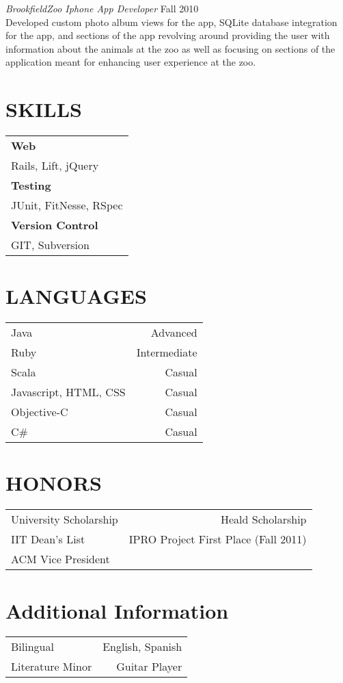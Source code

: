 \documentclass[margin]{res}
\newcommand{\tab}{\hspace*{2em}}
\begin{document}
\begin{resume}
               							 {\sl BrookfieldZoo Iphone App Developer} \hfill            Fall 2010 \\
														\tab Developed custom photo album views for the app, SQLite database integration for the app, and sections of the app revolving around providing the user with information about the animals at the zoo as well as focusing on sections of the application meant for enhancing user experience at the zoo.
  
\section{SKILLS} 
		\begin{tabular}{ l }
		\bf Web \\
		\tab Rails, Lift, jQuery\\
		\bf Testing\\
		\tab JUnit, FitNesse, RSpec\\
		\bf Version Control\\
		\tab GIT, Subversion\\
		\end{tabular}

\section{LANGUAGES}
		\begin{tabular}{ l r }
  			Java & Advanced \\
 			Ruby & Intermediate \\
                   	Scala & Casual \\
                   	Javascript, HTML, CSS & Casual \\
                   	Objective-C & Casual \\
                 		C\# & Casual \\
		\end{tabular}
                 
\section{HONORS}
		\begin{tabular}{ l r }
  			University Scholarship & Heald Scholarship \\
 			IIT Dean's List & IPRO Project First Place (Fall 2011) \\
			ACM Vice President
		\end{tabular}
		
\section{Additional Information}
		\begin{tabular}{ l r }
  			Bilingual & English, Spanish \\
 			Literature Minor & Guitar Player
		\end{tabular}

\end{resume}
\end{document}
